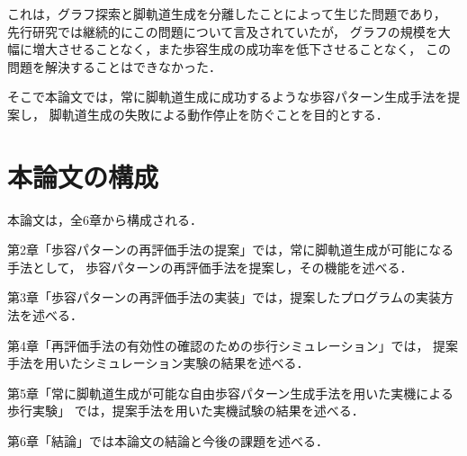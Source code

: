 これは，グラフ探索と脚軌道生成を分離したことによって生じた問題であり，
先行研究では継続的にこの問題について言及されていたが，
グラフの規模を大幅に増大させることなく，また歩容生成の成功率を低下させることなく，
この問題を解決することはできなかった．

そこで本論文では，常に脚軌道生成に成功するような歩容パターン生成手法を提案し，
脚軌道生成の失敗による動作停止を防ぐことを目的とする．

\section{本論文の構成}
本論文は，全6章から構成される．

第2章「歩容パターンの再評価手法の提案」では，常に脚軌道生成が可能になる手法として，
歩容パターンの再評価手法を提案し，その機能を述べる．

第3章「歩容パターンの再評価手法の実装」では，提案したプログラムの実装方法を述べる．

第4章「再評価手法の有効性の確認のための歩行シミュレーション」では，
提案手法を用いたシミュレーション実験の結果を述べる．

第5章「常に脚軌道生成が可能な自由歩容パターン生成手法を用いた実機による歩行実験」
では，提案手法を用いた実機試験の結果を述べる．

第6章「結論」では本論文の結論と今後の課題を述べる．
